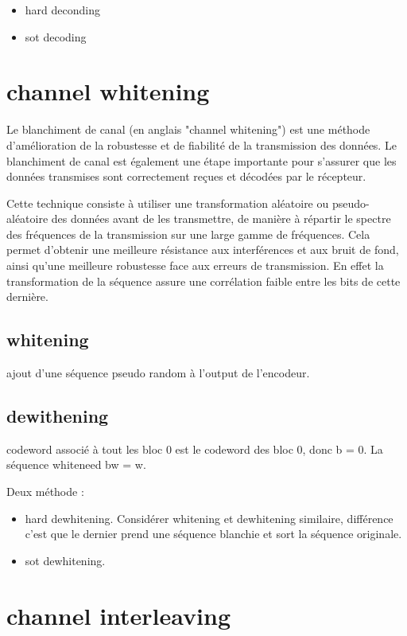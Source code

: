 \documentclass[12pt,a4paper,oneside, titlepage]{report}
\begin{document}
\begin{itemize}
\item hard deconding
\item sot decoding
\end{itemize}

\section{channel whitening}

Le blanchiment de canal (en anglais "channel whitening") est une méthode d'amélioration de la robustesse et de fiabilité de la transmission des données. Le blanchiment de canal est également une étape importante pour s'assurer que les données transmises sont correctement reçues et décodées par le récepteur.

Cette technique consiste à utiliser une transformation aléatoire ou pseudo-aléatoire des données avant de les transmettre, de manière à répartir le spectre des fréquences de la transmission sur une large gamme de fréquences. Cela permet d'obtenir une meilleure résistance aux interférences et aux bruit de fond, ainsi qu'une meilleure robustesse face aux erreurs de transmission. En effet la transformation de la séquence assure une corrélation faible entre les bits de cette dernière.

\subsection{whitening}

ajout d'une séquence pseudo random à l'output de l'encodeur.

\subsection{dewithening}

codeword associé à tout les bloc 0 est le codeword des bloc 0, donc b = 0. La séquence whiteneed bw = w.

Deux méthode :

\begin{itemize}
\item hard dewhitening. Considérer whitening et dewhitening similaire, différence c'est que le dernier prend une séquence blanchie et sort la séquence originale.
\item sot dewhitening. 
\end{itemize}


\section{channel interleaving}
\end{document}
